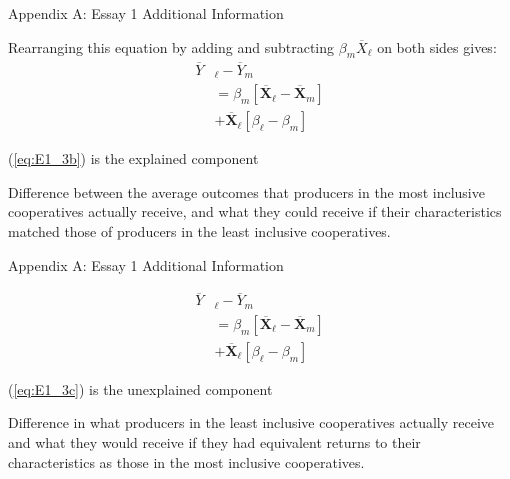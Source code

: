 \documentclass[aspectratio=169]{beamer}
\newenvironment{wideitemize}{\itemize\addtolength{\itemsep}{10pt}}{\enditemize}
\begin{document}
\begin{frame}{Appendix A: Essay 1 Additional Information}
    \begin{wideitemize}
        \item Rearranging this equation by adding and subtracting $\beta_{m}\overline{X}_{\ell}$ on both sides gives: \vspace{.25cm}
            \begin{subequations}
                \begin{align}
                \overline{Y}&_{\ell} - \overline{Y}_{m} \label{eq:E1_3a} \\
                &= \beta_{m}[\overline{\mathbf{X}}_{\ell} - \overline{\mathbf{X}}_{m}] \label{eq:E1_3b} \\
                &+ \overline{\mathbf{X}}_{\ell}[\beta_{\ell} - \beta_{m}] \label{eq:E1_3c}
                \end{align}
            \end{subequations}  
        \item (\ref{eq:E1_3b}) is the explained component \vspace{.25cm}
            \begin{wideitemize}
                \item Difference between the average outcomes that producers in the most inclusive cooperatives actually receive, and what they could receive if their characteristics matched those of producers in the least inclusive cooperatives.
            \end{wideitemize}
    \end{wideitemize}    
\end{frame}

\begin{frame}{Appendix A: Essay 1 Additional Information}
        \addtocounter{equation}{-1}
        \begin{subequations}
            \begin{align}
                \overline{Y}&_{\ell} - \overline{Y}_{m} \label{eq:E1_3a} \\
                &= \beta_{m}[\overline{\mathbf{X}}_{\ell} - \overline{\mathbf{X}}_{m}] \label{eq:E1_3b} \\
                &+ \overline{\mathbf{X}}_{\ell}[\beta_{\ell} - \beta_{m}] \label{eq:E1_3c}
            \end{align}
        \end{subequations}  
    \begin{wideitemize}
        \item (\ref{eq:E1_3c}) is the unexplained component \vspace{.25cm}
             \begin{wideitemize}
                \item Difference in what producers in the least inclusive cooperatives actually receive and what they would receive if they had equivalent returns to their characteristics as those in the most inclusive cooperatives.
            \end{wideitemize}
    \end{wideitemize}    
\end{frame}
\end{document}
